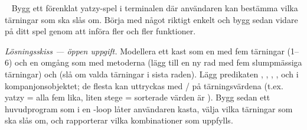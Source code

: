 
\QUESTBEGIN

\Task  \what~%
%
%
%
%
%
%
Bygg ett förenklat yatzy-spel i terminalen där användaren kan bestämma vilka tärningar som ska slås om. Börja med något riktigt enkelt och bygg sedan vidare på ditt spel genom att införa fler och fler funktioner.

\SOLUTION


\TaskSolved \what

\emph{Lösningsskiss --- öppen uppgift.} Modellera ett kast som en  med fem tärningar (1--6) och en omgång som  med metoderna  (lägg till en ny rad med fem slumpmässiga tärningar) och  (slå om valda tärningar i sista raden). Lägg predikaten , , , ,  och  i kompanjonsobjektet; de flesta kan uttryckas med / på tärningsvärdena (t.ex. yatzy = alla fem lika, liten stege = sorterade värden är ). Bygg sedan ett huvudprogram som i en -loop låter användaren kasta, välja vilka tärningar som ska slås om, och rapporterar vilka kombinationer som uppfylls.

